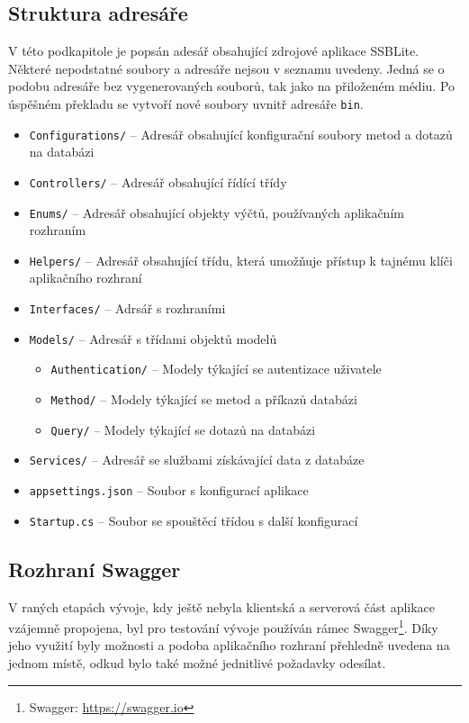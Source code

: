 \subsection{Struktura adresáře}
V této podkapitole je popsán adesář obsahující zdrojové aplikace SSBLite. Některé nepodstatné soubory a adresáře nejsou v seznamu uvedeny. Jedná se o podobu adresáře bez vygenerovaných souborů, tak jako na přiloženém médiu. Po úspěšném překladu se vytvoří nové soubory uvnitř adresáře \texttt{bin}.

\begin{itemize}
  \item \texttt{Configurations/} -- Adresář obsahující konfigurační soubory metod a dotazů na databázi
  \item \texttt{Controllers/} -- Adresář obsahující řídící třídy
  \item \texttt{Enums/} -- Adresář obsahující objekty výčtů, používaných aplikačním rozhraním
  \item \texttt{Helpers/} -- Adresář obsahující třídu, která umožňuje přístup k tajnému klíči aplikačního rozhraní
  \item \texttt{Interfaces/} -- Adrsář s rozhraními
  \item \texttt{Models/} -- Adresář s třídami objektů modelů
  \begin{itemize}
    \item \texttt{Authentication/} -- Modely týkající se autentizace uživatele
    \item \texttt{Method/} -- Modely týkající se metod a příkazů databázi
    \item \texttt{Query/} -- Modely týkající se dotazů na databázi 
  \end{itemize}
  \item \texttt{Services/} -- Adresář se službami získávající data z databáze
  \item \texttt{appsettings.json} -- Soubor s konfigurací aplikace
  \item \texttt{Startup.cs} -- Soubor se spouštěcí třídou s další konfigurací
\end{itemize}


\subsection{Rozhraní Swagger}
V raných etapách vývoje, kdy ještě nebyla klientská a serverová část aplikace vzájemně propojena, byl pro testování vývoje používán rámec Swagger\footnote{Swagger: \url{https://swagger.io}}. Díky jeho využití byly možnosti a podoba aplikačního rozhraní přehledně uvedena na jednom místě, odkud bylo také možné jednitlivé požadavky odesílat.

